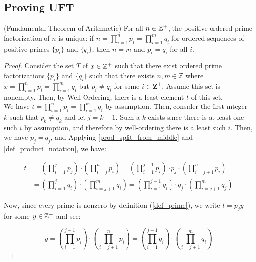 \subsection{Proving UFT}

\begin{theorem}\label{uft}
(Fundamental Theorem of Arithmetic) For all $n \in \mathbb{Z}^+$, the positive ordered prime factorization of $n$ is unique: if $n = \prod_{i=1}^{n} p_i = \prod_{i=1}^m q_i$ for ordered sequences of positive primes $\{p_i\}$ and $\{q_i\}$, then $n = m$ and $p_i = q_i$ for all $i$. 
\end{theorem}

\begin{proof}
Consider the set $T$ of $x \in \mathbb{Z}^+$ such that there exist ordered prime factorizations $\{ p_i \}$ and $\{ q_i \}$ such that there exists $n, m \in \mathbb{Z} $ where $x = \prod_{i=1}^{n} p_i = \prod_{i=1}^{m} q_i$ but $p_i \neq q_i$ for some $i \in \mathbf{Z}^+$. Assume this set is nonempty. Then, by Well-Ordering, there is a least element $t$ of this set. \\

We have $t = \prod_{i=1}^{n} p_i = \prod_{i=1}^m q_i$ by assumption. Then, consider the first integer $k$ such that $p_k \neq q_k$ and let $j = k-1$. Such a $k$ exists since there is at least one such $i$ by assumption, and therefore by well-ordering there is a least such $i$. Then, we have $p_j = q_j$, and Applying \ref{prod_split_from_middle} and \ref{def_product_notation}, we have:

\begin{align*}
    t &= \left( \prod_{i=1}^{j} p_j \right) \cdot \left( \prod_{i=j}^{n} p_i \right) = \left( \prod_{i=1}^{j-1} p_i \right) \cdot p_j \cdot \left( \prod_{i=j+1}^{n} p_i \right) \\ &= \left( \prod_{i=1}^{j} q_i \right) \cdot \left( \prod_{i=j+1}^{m} q_i \right) = \left( \prod_{i=1}^{j-1} q_i \right) \cdot q_j \cdot \left( \prod_{i=j+1}^{m} q_j \right)
\end{align*}


Now, since every prime is nonzero by definition (\ref{def_prime}), we write $t = p_j y$ for some $y \in \mathbb{Z}^+$ and see:

\begin{equation*}
    y = \left( \prod_{i=1}^{j-1} p_i \right)  \cdot \left( \prod_{i=j+1}^{n} p_i \right) = \left( \prod_{i=1}^{j-1} q_i \right) \cdot \left( \prod_{i=j+1}^{m} q_i \right)
\end{equation*}


\end{proof}
